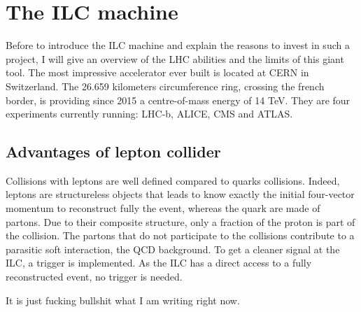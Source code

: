 



  
  
   
  \section{The ILC machine}
 
  Before to introduce the ILC machine and explain the reasons to invest in such a project, I will give an overview of the LHC abilities and the limits of this giant tool.
  The most impressive accelerator ever built is located at CERN in Switzerland. 
  The 26.659 kilometers circumference ring, crossing the french border, is providing since 2015 a centre-of-mass energy of 14 TeV.
  They are four experiments currently running: LHC-b, ALICE, CMS and ATLAS.
   
    \subsection{Advantages of lepton collider}

    Collisions with leptons are well defined compared to quarks collisions. 
    Indeed, leptons are structureless objects that leads to know exactly the initial four-vector momentum to reconstruct fully the event, whereas the quark are made of partons.
    Due to their composite structure, only a fraction of the proton is part of the collision. 
    The partons that do not participate to the collisions contribute to a parasitic soft interaction, the QCD background.
    To get a cleaner signal at the ILC, a trigger is implemented.
    As the ILC has a direct access to a fully reconstructed event, no trigger is needed.

    It is just fucking bullshit what I am writing right now. 

    
